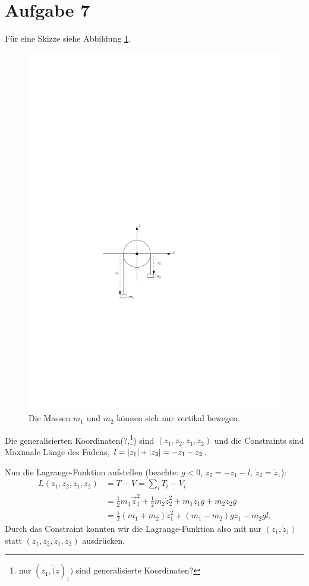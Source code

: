 \section*{Aufgabe 7}

Für eine Skizze siehe Abbildung \ref{fig:ueb3_aufgabe7}.

\begin{figure}[h]
	\centering
	\includegraphics{figures/ueb3/aufgabe7}
	\caption{Die Massen $m_1$ und $m_2$ können sich nur vertikal bewegen.}
	\label{fig:ueb3_aufgabe7}
\end{figure}

Die generalisierten Koordinaten(?,\footnote{nur $(z_1, \dot(z)_1)$ sind generalisierte Koordinaten?}) sind $(z_1, z_2, \dot{z}_1, \dot{z}_2)$ und die Constraints sind Maximale Länge des Fadens, $l = \left\lvert z_1 \right\rvert + \left\lvert z_2 \right\rvert = -z_1 - z_2$.

Nun die Lagrange-Funktion aufstellen (beachte: $g < 0$, $z_2 = -z_1 - l$, $\dot{z}_2 = \dot{z}_1$): 
\begin{align*}
	L(z_1, z_2, \dot{z}_1, \dot{z}_2) 
	&= T - V = \sum_i T_i - V_i \\
	&= \frac{1}{2} m_1 \vec{z}_1^2 + \frac{1}{2} m_2 \dot{z}_2^2 + m_1 z_1 g + m_2 z_2 g \\
	&= \frac{1}{2} (m_1 + m_2) \dot{z}_1^2 + (m_1 - m_2) g z_1 - m_2 g l
	\text{.}
\end{align*}
Durch das Constraint konnten wir die Lagrange-Funktion also mit nur $(z_1, \dot{z}_1)$ statt $(z_1, z_2, \dot{z}_1, \dot{z}_2)$ ausdrücken.

